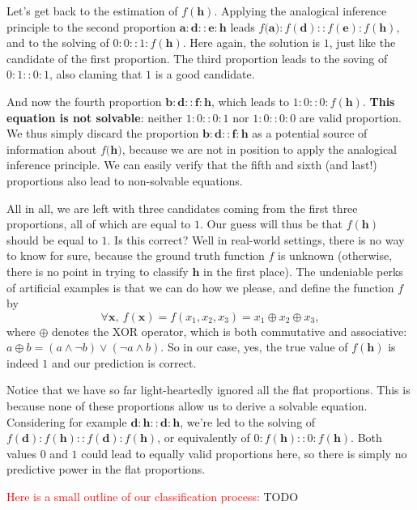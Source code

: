 Let's get back to the estimation of $f(\mathbf{h})$. Applying the analogical
inference principle to the second proportion $\mathbf{a} : \mathbf{d} ::
\mathbf{e} : \mathbf{h}$ leads $f(\mathbf{a)} : f(\mathbf{d}) :: f(\mathbf{e})
: f(\mathbf{h})$, and to the solving of $0:0::1:f(\mathbf{h})$. Here again, the
solution is $1$, just like the candidate of the first proportion.
The third proportion leads to the soving of $0:1::0:1$, also claming that $1$
is a good candidate.

And now the fourth proportion $\mathbf{b} : \mathbf{d} :: \mathbf{f} :
\mathbf{h}$, which leads to $1:0::0:f(\mathbf{h})$. \textbf{This equation is not
solvable}: neither $1:0::0:1$ nor $1:0::0:0$ are valid proportion. We thus
simply discard the proportion $\mathbf{b} : \mathbf{d} :: \mathbf{f} :
\mathbf{h}$ as a potential source of information about $f(\mathbf{h)}$, because
we are not in position to apply the analogical inference principle. We can
easily verify that the fifth and sixth (and last!) proportions also lead to
non-solvable equations.

All in all, we are left with three candidates coming from the first three
proportions, all of which are equal to $1$. Our guess will thus be that
$f(\mathbf{h})$ should be equal to $1$. Is this correct? Well in real-world
settings, there is no way to know for sure, because the ground truth function
$f$ is unknown (otherwise, there is no point in trying to classify $\mathbf{h}$
in the first place). The undeniable perks of artificial examples is that we can
do how we please, and define the function $f$ by
$$\forall \mathbf{x}, ~ f(\mathbf{x}) = f(x_1, x_2, x_3) = x_1 \oplus x_2 \oplus x_3,$$
where $\oplus$ denotes the XOR operator, which is both commutative and
associative: $a \oplus b = (a \wedge \neg b) \vee (\neg a \wedge b)$. So in our
case, yes, the true value of $f(\mathbf{h})$ is indeed $1$ and our prediction
is correct.

Notice that we have so far light-heartedly ignored  all the flat proportions.
This is because none of these proportions allow us to derive a solvable
equation. Considering for example $\mathbf{d} : \mathbf{h} :: \mathbf{d} :
\mathbf{h}$, we're led to the solving of $f(\mathbf{d}) : f(\mathbf{h}) ::
f(\mathbf{d}) : f(\mathbf{h})$, or equivalently of $0 : f(\mathbf{h}) :: 0 :
f(\mathbf{h})$. Both values $0$ and $1$ could lead to equally valid proportions
here, so there is simply no predictive power in the flat proportions.

\textcolor{red}{Here is a small outline of our classification process:}
TODO

